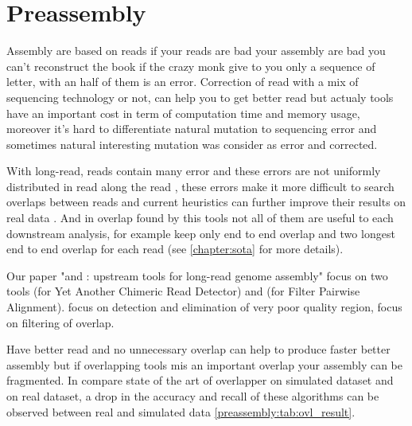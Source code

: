 \documentclass[main.tex]{subfiles}
\begin{document}
\chapter{Preassembly}\label{chapter:preassembly}

Assembly are based on reads if your reads are bad your assembly are bad you can't reconstruct the book if the crazy monk give to you only a sequence of letter, with an half of them is an error. Correction of read with a mix of sequencing technology or not, can help you to get better read but actualy tools have an important cost in term of computation time and memory usage, moreover it's hard to differentiate natural mutation to sequencing error and sometimes natural interesting mutation was consider as error and corrected.

With long-read, reads contain many error and these errors are not uniformly distributed in read along the read \cite{blog_post_error_repartition}, these errors make it more difficult to search overlaps between reads and current heuristics can further improve their results on real data \cite{ovl_bench}.
And in overlap found by this tools not all of them are useful to each downstream analysis, for example \miniasm keep only end to end overlap and \canu two longest end to end overlap for each read (see \ref{chapter:sota} for more details).

Our paper "\yacrd and \fpa: upstream tools for long-read genome assembly" focus on two tools \yacrd (for Yet Another Chimeric Read Detector) and \fpa (for Filter Pairwise Alignment). \yacrd focus on detection and elimination of very poor quality region, \fpa focus on filtering of overlap.


Have better read and no unnecessary overlap can help to produce faster better assembly but if overlapping tools mis an important overlap your assembly can be fragmented.
In \cite{ovl_bench} \citeauthor{ovl_bench} compare state of the art of overlapper on simulated dataset and on real dataset, a drop in the accuracy and recall of these algorithms can be observed between real and simulated data \ref{preassembly:tab:ovl_result}.
\end{document}
